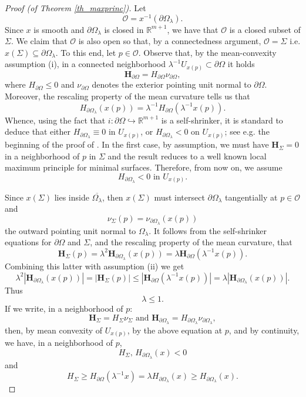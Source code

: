 \documentclass[11pt,leqno]{amsart}\usepackage{amsmath}
\numberwithin{equation}{section}
\begin{document}
\begin{proof}
[Proof (of Theorem \ref{th_maxprinc})]Let
\[
\mathcal{O}=x^{-1}\left(  \partial\Omega_{\lambda}\right)  .
\]
Since $x$ is smooth and $\partial\Omega_{\lambda}$ is closed in $\mathbb{R}^{m+1}$, we have that $\mathcal{O}$ is a closed subset of $\Sigma$. We claim
that $\mathcal{O}$ is also open so that, by a connectedness argument,
$\mathcal{O}=\Sigma$ i.e. $x\left(  \Sigma\right)  \subseteq\partial
\Omega_{\lambda}$. To this end, let $p\in\mathcal{O}$. Observe that, by the
mean-convexity assumption (i), in a connected neighborhood
$\lambda^{-1}U_{x(p)}\subset\partial\Omega$  it holds
\[
\mathbf{H}_{\partial\Omega}=H_{\partial\Omega}\nu_{\partial\Omega},
\]
where $H_{\partial\Omega}\leq0$ and $\nu_{\partial\Omega}$ denotes the
exterior pointing unit normal to $\partial\Omega$. Moreover, the rescaling
property of the mean curvature tells us that
\[
H_{\partial\Omega_{\lambda}}(x(p))=\lambda^{-1}H_{\partial\Omega}(\lambda
^{-1}x(p)).
\]
Whence, using the fact that $i:\partial\Omega\hookrightarrow\mathbb{R}^{m+1}$
is a self-shrinker, it is standard to deduce that either $H_{\partial
\Omega_{\lambda}}\equiv0$ in $U_{x(p)}$, or $H_{\partial\Omega_{\lambda}}<0$ on $U_{x(p)}$; see e.g. the
beginning of the proof of \cite[Theorem 2]{Ri-self}. In the first case, by
assumption, we must have $\mathbf{H}_{\Sigma}=0$ in a neighborhood of $p$ in
$\Sigma$ and the result reduces to a well known local maximum principle for
minimal surfaces. Therefore, from now on, we assume\[
H_{\partial\Omega_{\lambda}}<0\text{ in }U_{x(p)}.
\]


Since $x\left(  \Sigma\right)  $ lies inside $\overline{\Omega_{\lambda}}$,
then $x\left(  \Sigma\right)  $ must intersect $\partial\Omega_{\lambda}$
tangentially at $p\in\mathcal{O}$ and
\[
\nu_{\Sigma}\left(  p\right)  =\nu_{\partial\Omega_{\lambda}}\left(  x\left(
p\right)  \right)
\]
the outward pointing unit normal to $\Omega_{\lambda}$. It follows from the
self-shrinker equations for $\partial\Omega$ and $\Sigma$, and the rescaling property of the
mean curvature, that
\[
\mathbf{H}_{\Sigma}\left(  p\right)  =\lambda^{2}\mathbf{H}_{\partial
\Omega_{\lambda}}(x(p))=\lambda\mathbf{H}_{\partial\Omega}(\lambda^{-1}x(p)).
\]
Combining this latter with assumption (ii) we get\[
\lambda^{2}\left\vert \mathbf{H}_{\partial\Omega_{\lambda}}\left(  x\left(
p\right)  \right)  \right\vert =\left\vert \mathbf{H}_{\Sigma}\left(
p\right)  \right\vert \leq\left\vert \mathbf{H}_{\partial\Omega}\left(
\lambda^{-1}x\left(  p\right)  \right)  \right\vert =\lambda\left\vert
\mathbf{H}_{\partial\Omega_{\lambda}}\left(  x\left(  p\right)  \right)
\right\vert .
\]
Thus\[
\lambda\leq1.
\]
If we write, in a neighborhood of $p$:
\[
\mathbf{H}_{\Sigma}=H_{\Sigma}\nu_{\Sigma}\text{ and }\mathbf{H}_{\partial\Omega_{\lambda}}=H_{\partial\Omega_{\lambda}}\nu_{\partial
\Omega_{\lambda}},
\]
then, by mean convexity of $U_{x(p)}$, by the above equation at $p$, and by
continuity, we have,  in a neighborhood of $p$,
\[
H_{\Sigma}\text{, }H_{\partial\Omega_{\lambda}}(x)<0
\]
and
\[
H_{\Sigma}\geq H_{\partial\Omega}\left(  \lambda^{-1}x\right)  =\lambda
H_{\partial\Omega_{\lambda}}\left(  x\right)  \geq H_{\partial\Omega_{\lambda
}}\left(  x\right)  .
\]


\end{proof}
\end{document}
